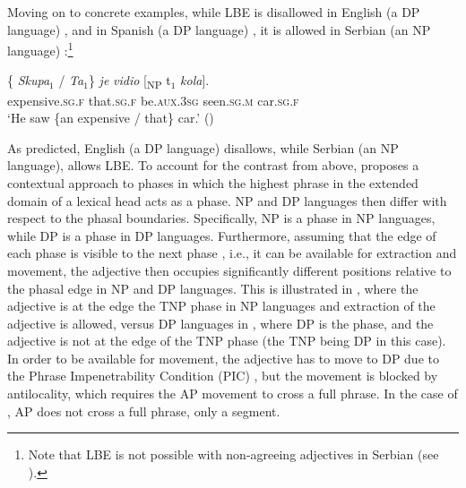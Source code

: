 \documentclass[output=paper,hidelinks,newtxmath,]{langscibook}
\begin{document}
Moving on to concrete examples, while LBE is disallowed in English (a DP language) , and in Spanish (a DP language) , it is allowed in Serbian (an NP language) :\footnote{\label{15:fn3}Note that LBE is not possible with non-agreeing adjectives in Serbian (see \citealt{Boskovic2013}).}

    \label{15:ex2}
 \z


\ea \label{15:ex3}
	\z
\z

\ea \label{15:ex4}
\gll \{\hspace{-2pt} \textit{Skupa$_1$} / \textit{Ta$_1$}\} \textit{je} \textit{vidio} [\textsubscript{NP} t$_1$ \textit{kola}].\\
     {} expensive\textsc{.sg.f} {} that\textsc{.sg.f} be.\textsc{aux.3sg} seen.\textsc{sg.m} {} {} car.\textsc{sg.f}\\
\glt `He saw \{an expensive / that\} car.' \hfill (\citealt{Boskovic2008})
\z

\noindent As predicted, English (a DP language) disallows, while Serbian (an NP language), allows LBE. To account for the contrast from above, \citet{Boskovic2013,Boskovic2014} proposes a contextual approach to phases in which the highest phrase in the extended domain of a lexical head acts as a phase. NP and DP languages then differ with respect to the phasal boundaries. Specifically, NP is a phase in NP languages, while DP is a phase in DP languages. Furthermore, assuming that the edge of each phase is visible to the next phase \citep{Chomsky2001}, i.e., it can be available for extraction and movement, the adjective then occupies significantly different positions relative to the phasal edge in NP and DP languages. This is illustrated in , where the adjective is at the edge the TNP phase in NP languages  and extraction of the adjective is allowed, versus DP languages in , where DP is the phase, and the adjective is not at the edge of the TNP phase (the TNP being DP in this case). In order to be available for movement, the adjective has to move to DP due to the Phrase Impenetrability Condition (PIC) \citep{Chomsky2001}, but the movement is blocked by antilocality, which requires the AP movement to cross a full phrase. In the case of , AP does not cross a full phrase, only a segment.
\end{document}
